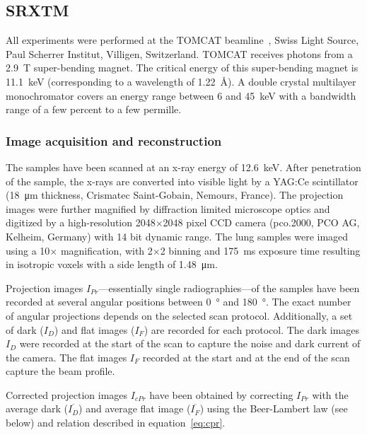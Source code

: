 \subsection{SRXTM}%
All experiments were performed at the TOMCAT beamline~\cite{Stampanoni2006a}, Swiss Light Source, Paul Scherrer Institut, Villigen, Switzerland. TOMCAT receives photons from a \SI{2.9}{\tesla} super-bending magnet. The critical energy of this super-bending magnet is \SI{11.1}{\kilo\electronvolt} (corresponding to a wavelength of \SI{1.22}{\angstrom}). A double crystal multilayer monochromator covers an energy range between 6 and \SI{45}{\kilo\electronvolt} with a bandwidth range of a few percent to a few permille.

\subsubsection{Image acquisition and reconstruction}%
\label{seq:Image Acquisition}%
The samples have been scanned at an x-ray energy of \SI{12.6}{\kilo\electronvolt}. After penetration of the sample, the x-rays are converted into visible light by a YAG:Ce scintillator (\SI{18}{\micro\meter} thickness, Crismatec Saint-Gobain, Nemours, France). The projection images were further magnified by diffraction limited microscope optics and digitized by a high-resolution 2048$\times$2048 pixel CCD camera (pco.2000, PCO AG, Kelheim, Germany) with 14 bit dynamic range. The lung samples were imaged using a 10$\times$ magnification, with 2$\times$2 binning and \SI{175}{\milli\second} exposure time resulting in isotropic voxels with a side length of \SI{1.48}{\micro\meter}.

Projection images $I_{Pr}$---essentially single radiographies---of the samples have been recorded at several angular positions between \SI{0}{\degree} and \SI{180}{\degree}. The exact number of angular projections depends on the selected scan protocol. Additionally, a set of dark ($I_{D}$) and flat images ($I_{F}$) are recorded for each protocol. The dark images $I_{D}$ were recorded at the start of the scan to capture the noise and dark current of the camera. The flat images $I_{F}$ recorded at the start and at the end of the scan capture the beam profile.

Corrected projection images $I_{cPr}$ have been obtained by correcting $I_{Pr}$ with the average dark ($\overline{I_{D}}$) and average flat image ($\overline{I_{F}}$) using the Beer-Lambert law (see below) and relation described in equation~\ref{eq:cpr}.

